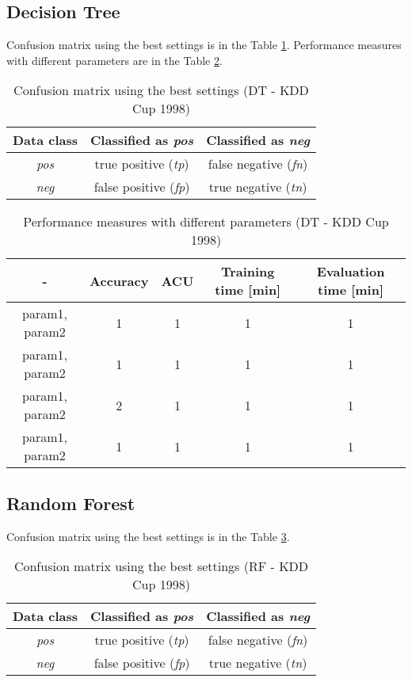 \documentclass[11pt,a4paper,titlepage]{article}
\begin{document}
\subsection{Decision Tree}

Confusion matrix using the best settings is in the Table \ref{table:confusionMatrixDTKDD}. Performance measures with different parameters are in the Table \ref{table:DTKDD}.
\begin{table}
  \centering
  \begin{tabular}{| c | c | c |}
    \hline
    Data class & Classified as \textit{pos} & Classified as \textit{neg} \\ \hline
    \textit{pos} & true positive (\textit{tp}) & false negative (\textit{fn}) \\ \hline
    \textit{neg} & false positive (\textit{fp}) & true negative (\textit{tn}) \\
    \hline
  \end{tabular}
  \caption{Confusion matrix using the best settings (DT - KDD Cup 1998)}
  \label{table:confusionMatrixDTKDD}
  \end{table}
  
  \begin{table}
  \centering
  \begin{tabular}{| c | c | c | c | c |}
    \hline
     		-	   & Accuracy & 	ACU 	& Training time [min] & Evaluation time [min] \\ \hline
    param1, param2 &  1 	  &     1		& 		1			  & 		1 		\\ \hline
    param1, param2 & 	1	  & 	1 		& 		1			  &			1 		\\ \hline
    param1, param2 & 	2	  & 	1		& 		1			  &			1		\\ \hline
    param1, param2 &  1       & 	1		& 		1			  &			1			\\
    \hline
  \end{tabular}
  \caption{Performance measures with different parameters (DT - KDD Cup 1998)}
  \label{table:DTKDD}
  \end{table}

\subsection{Random Forest}
Confusion matrix using the best settings is in the Table \ref{table:confusionMatrixRFKDD}. 
\begin{table}
  \centering
  \begin{tabular}{| c | c | c |}
    \hline
    Data class & Classified as \textit{pos} & Classified as \textit{neg} \\ \hline
    \textit{pos} & true positive (\textit{tp}) & false negative (\textit{fn}) \\ \hline
    \textit{neg} & false positive (\textit{fp}) & true negative (\textit{tn}) \\
    \hline
  \end{tabular}
  \caption{Confusion matrix using the best settings (RF - KDD Cup 1998)}
  \label{table:confusionMatrixRFKDD}
  \end{table}
  
\end{document}
